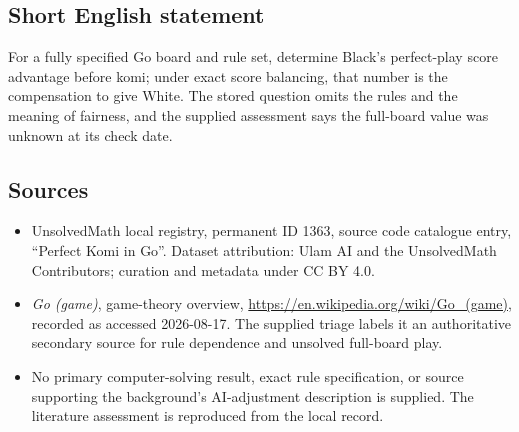 \documentclass[11pt]{article}
\begin{document}
\subsection{Short English statement}
For a fully specified Go board and rule set, determine Black's perfect-play score advantage before komi; under exact score balancing, that number is the compensation to give White. The stored question omits the rules and the meaning of fairness, and the supplied assessment says the full-board value was unknown at its check date.
\subsection{Sources}
\begin{itemize}
\item UnsolvedMath local registry, permanent ID 1363, source code catalogue entry, ``Perfect Komi in Go''. Dataset attribution: Ulam AI and the UnsolvedMath Contributors; curation and metadata under CC BY 4.0.
\item \emph{Go (game)}, game-theory overview, \url{https://en.wikipedia.org/wiki/Go_(game)}, recorded as accessed 2026-08-17. The supplied triage labels it an authoritative secondary source for rule dependence and unsolved full-board play.
\item No primary computer-solving result, exact rule specification, or source supporting the background's AI-adjustment description is supplied. The literature assessment is reproduced from the local record.
\end{itemize}
\end{document}

